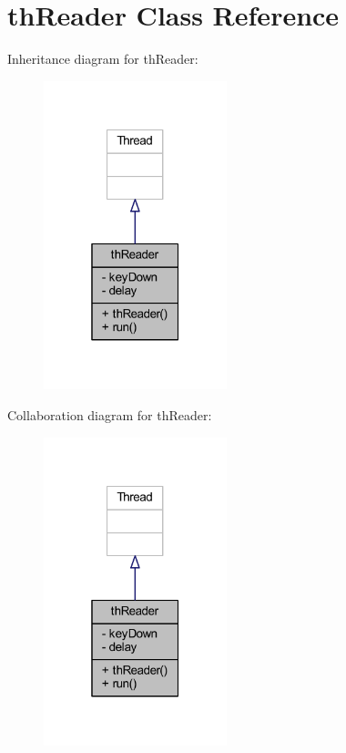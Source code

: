 \hypertarget{class_snake_1_1game_1_1threads_1_1th_reader}{}\section{th\+Reader Class Reference}
\label{class_snake_1_1game_1_1threads_1_1th_reader}


Inheritance diagram for th\+Reader\+:
\nopagebreak
\begin{figure}[H]
\begin{center}
\leavevmode
\includegraphics[width=151pt]{class_snake_1_1game_1_1threads_1_1th_reader__inherit__graph}
\end{center}
\end{figure}


Collaboration diagram for th\+Reader\+:
\nopagebreak
\begin{figure}[H]
\begin{center}
\leavevmode
\includegraphics[width=151pt]{class_snake_1_1game_1_1threads_1_1th_reader__coll__graph}
\end{center}
\end{figure}
